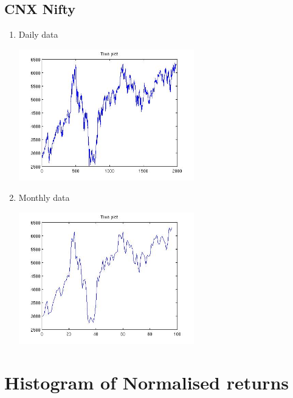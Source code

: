 \documentclass[12pt]{article}
\begin{document}
  \subsection*{CNX Nifty}
  \begin{enumerate}
    \item Daily data
      \begin{center}
        \includegraphics[width=3in]{niftydaily.jpg}
      \end{center}
    \item Monthly data
      \begin{center}
        \includegraphics[width=3in]{niftymonthly.jpg}
      \end{center}
  \end{enumerate}

\newpage
\section{Histogram of Normalised returns}
\end{document}
